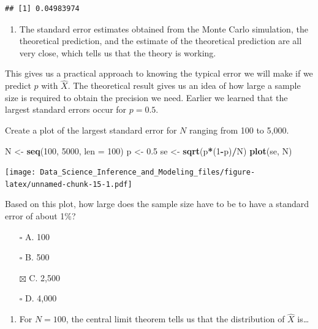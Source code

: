 \documentclass[
]{article}
\newenvironment{Shaded}{\begin{snugshade}}{\end{snugshade}}
\newcommand{\DataTypeTok}[1]{\textcolor[rgb]{0.13,0.29,0.53}{#1}}
\newcommand{\DecValTok}[1]{\textcolor[rgb]{0.00,0.00,0.81}{#1}}
\newcommand{\FloatTok}[1]{\textcolor[rgb]{0.00,0.00,0.81}{#1}}
\newcommand{\KeywordTok}[1]{\textcolor[rgb]{0.13,0.29,0.53}{\textbf{#1}}}
\newcommand{\NormalTok}[1]{#1}
\newcommand{\OperatorTok}[1]{\textcolor[rgb]{0.81,0.36,0.00}{\textbf{#1}}}
\newcommand{\StringTok}[1]{\textcolor[rgb]{0.31,0.60,0.02}{#1}}
\providecommand{\tightlist}{%
  \setlength{\itemsep}{0pt}\setlength{\parskip}{0pt}}
\begin{document}
\begin{verbatim}
## [1] 0.04983974
\end{verbatim}

\begin{enumerate}
\def\labelenumi{\arabic{enumi}.}
\setcounter{enumi}{7}
\tightlist
\item
  The standard error estimates obtained from the Monte Carlo simulation,
  the theoretical prediction, and the estimate of the theoretical
  prediction are all very close, which tells us that the theory is
  working.
\end{enumerate}

This gives us a practical approach to knowing the typical error we will
make if we predict \(p\) with \(\hat{X}\). The theoretical result gives
us an idea of how large a sample size is required to obtain the
precision we need. Earlier we learned that the largest standard errors
occur for \(p = 0.5\).

Create a plot of the largest standard error for \(N\) ranging from 100
to 5,000.

\begin{Shaded}
\begin{Highlighting}[]
\NormalTok{N \textless{}{-}}\StringTok{ }\KeywordTok{seq}\NormalTok{(}\DecValTok{100}\NormalTok{, }\DecValTok{5000}\NormalTok{, }\DataTypeTok{len =} \DecValTok{100}\NormalTok{)}
\NormalTok{p \textless{}{-}}\StringTok{ }\FloatTok{0.5}
\NormalTok{se \textless{}{-}}\StringTok{ }\KeywordTok{sqrt}\NormalTok{(p}\OperatorTok{*}\NormalTok{(}\DecValTok{1}\OperatorTok{{-}}\NormalTok{p)}\OperatorTok{/}\NormalTok{N)}
\KeywordTok{plot}\NormalTok{(se, N)}
\end{Highlighting}
\end{Shaded}

\texttt{[image: Data\_Science\_Inference\_and\_Modeling\_files/figure-latex/unnamed-chunk-15-1.pdf]}

Based on this plot, how large does the sample size have to be to have a
standard error of about 1\%?

\begin{itemize}
\tightlist
\item[$\square$]
  A. 100
\item[$\square$]
  B. 500
\item[$\boxtimes$]
  C. 2,500
\item[$\square$]
  D. 4,000
\end{itemize}

\begin{enumerate}
\def\labelenumi{\arabic{enumi}.}
\setcounter{enumi}{8}
\tightlist
\item
  For \(N = 100\), the central limit theorem tells us that the
  distribution of \(\hat{X}\) is\ldots{}
\end{enumerate}
\end{document}
